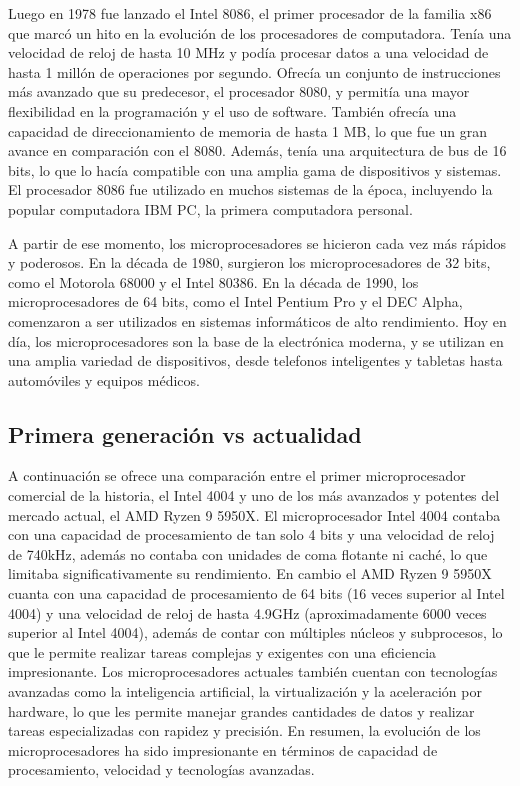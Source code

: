 \documentclass{article}
\begin{document}
Luego en 1978 fue lanzado el Intel 8086, el primer procesador de la familia x86 que marcó un hito en la evolución de los procesadores de computadora. 
Tenía una velocidad de reloj de hasta 10 MHz y podía procesar datos a una velocidad de hasta 1 millón de operaciones por segundo. 
Ofrecía un conjunto de instrucciones más avanzado que su predecesor, el procesador 8080, y permitía una mayor flexibilidad en la programación y 
el uso de software. También ofrecía una capacidad de direccionamiento de memoria de hasta 1 MB, lo que fue un gran avance en comparación con el 8080. 
Además, tenía una arquitectura de bus de 16 bits, lo que lo hacía compatible con una amplia gama de dispositivos y sistemas.
El procesador 8086 fue utilizado en muchos sistemas de la época, incluyendo la popular computadora IBM PC, la primera computadora personal.

A partir de ese momento, los microprocesadores se hicieron cada vez más rápidos y poderosos. En la década de 1980, surgieron los microprocesadores de 32 bits,
 como el Motorola 68000 y el Intel 80386. En la década de 1990, los microprocesadores de 64 bits, como el Intel Pentium Pro y el DEC Alpha, 
 comenzaron a ser utilizados en sistemas informáticos de alto rendimiento. Hoy en día, los microprocesadores son la base de la electrónica moderna, 
 y se utilizan en una amplia variedad de dispositivos, desde telefonos inteligentes y tabletas hasta automóviles y equipos médicos.
\subsection*{Primera generación vs actualidad}
A continuación se ofrece una comparación entre el primer microprocesador comercial de la historia, 
el Intel 4004 y uno de los más avanzados y potentes del mercado actual, el AMD Ryzen 9 5950X. 
El microprocesador Intel 4004 contaba con una capacidad de procesamiento de tan solo 4 bits y una 
velocidad de reloj de 740kHz, además no contaba con unidades de coma flotante ni caché, lo que limitaba 
significativamente su rendimiento. En cambio el AMD Ryzen 9 5950X cuanta con una capacidad de procesamiento
de 64 bits (16 veces superior al Intel 4004) y una velocidad de reloj de hasta 4.9GHz (aproximadamente 6000 veces superior 
al Intel 4004), además de contar con múltiples núcleos y subprocesos, lo que le permite realizar tareas complejas 
y exigentes con una eficiencia impresionante. Los microprocesadores actuales también cuentan con tecnologías avanzadas 
como la inteligencia artificial, la virtualización y la aceleración por hardware, lo que les permite manejar 
grandes cantidades de datos y realizar tareas especializadas con rapidez y precisión. En resumen, la evolución de 
los microprocesadores ha sido impresionante en términos de capacidad de procesamiento, velocidad y tecnologías avanzadas.
\end{document}
